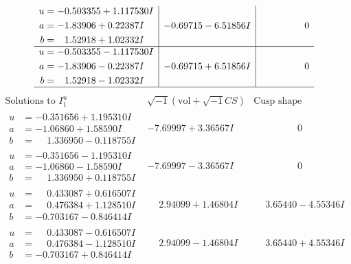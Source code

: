 \documentclass[1p]{elsarticle_modified}
\theoremstyle{definition}
\newcommand{\I}{\sqrt{-1}}
\begin{document}
$$\begin{array}{c|c|c}
\begin{aligned}
u &= -0.503355 + 1.117530 I \\
a &= -1.83906 + 0.22387 I \\
b &= \phantom{-}1.52918 + 1.02332 I\end{aligned}
 & -0.69715 - 6.51856 I & \phantom{-0.000000 } 0 \\ \hline\begin{aligned}
u &= -0.503355 - 1.117530 I \\
a &= -1.83906 - 0.22387 I \\
b &= \phantom{-}1.52918 - 1.02332 I\end{aligned}
 & -0.69715 + 6.51856 I & \phantom{-0.000000 } 0\\
 \hline 
 \end{array}$$\newpage$$\begin{array}{c|c|c}  
\text{Solutions to }I^u_{1}& \I (\text{vol} + \sqrt{-1}CS) & \text{Cusp shape}\\
 \hline 
\begin{aligned}
u &= -0.351656 + 1.195310 I \\
a &= -1.06860 + 1.58590 I \\
b &= \phantom{-}1.336950 - 0.118755 I\end{aligned}
 & -7.69997 + 3.36567 I & \phantom{-0.000000 } 0 \\ \hline\begin{aligned}
u &= -0.351656 - 1.195310 I \\
a &= -1.06860 - 1.58590 I \\
b &= \phantom{-}1.336950 + 0.118755 I\end{aligned}
 & -7.69997 - 3.36567 I & \phantom{-0.000000 } 0 \\ \hline\begin{aligned}
u &= \phantom{-}0.433087 + 0.616507 I \\
a &= \phantom{-}0.476384 + 1.128510 I \\
b &= -0.703167 - 0.846414 I\end{aligned}
 & \phantom{-}2.94099 + 1.46804 I & \phantom{-}3.65440 - 4.55346 I \\ \hline\begin{aligned}
u &= \phantom{-}0.433087 - 0.616507 I \\
a &= \phantom{-}0.476384 - 1.128510 I \\
b &= -0.703167 + 0.846414 I\end{aligned}
 & \phantom{-}2.94099 - 1.46804 I & \phantom{-}3.65440 + 4.55346 I \\ \hline\begin{aligned}

\end{aligned}
\end{array}$$
\end{document}
